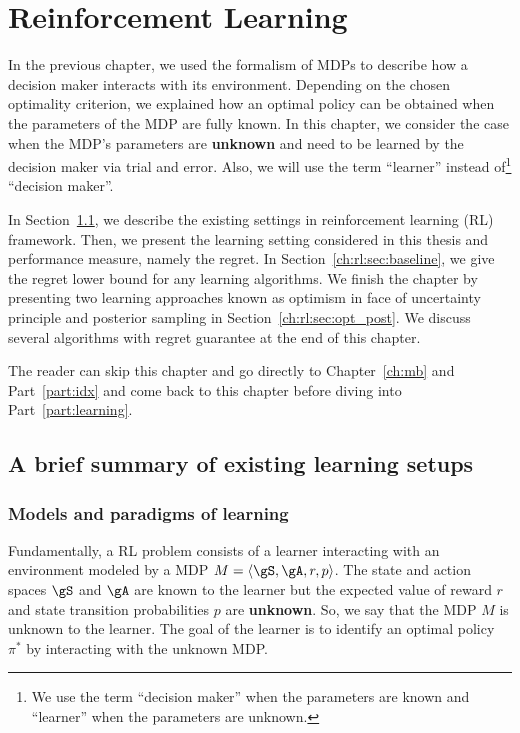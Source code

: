 \begingroup

\let\clearpage\relax

\chapter{Reinforcement Learning}
\label{ch:rl}


In the previous chapter, we used the formalism of MDPs to describe how a decision maker interacts with its environment.
Depending on the chosen optimality criterion, we explained how an optimal policy can be obtained when the parameters of the MDP are fully known.
In this chapter, we consider the case when the MDP's parameters are \textbf{unknown} and need to be learned by the decision maker via trial and error.
Also, we will use the term ``learner'' instead of\footnote{We use the term ``decision maker'' when the parameters are known and ``learner'' when the parameters are unknown.} ``decision maker''.

In Section~\ref{ch:rl:sec:overal}, we describe the existing settings in reinforcement learning (RL) framework.
Then, we present the learning setting considered in this thesis and performance measure, namely the regret. 
In Section~\ref{ch:rl:sec:baseline}, we give the regret lower bound for any learning algorithms.
We finish the chapter by presenting two learning approaches known as optimism in face of uncertainty principle and posterior sampling in Section~\ref{ch:rl:sec:opt_post}.
We discuss several algorithms with regret guarantee at the end of this chapter.

The reader can skip this chapter and go directly to Chapter~\ref{ch:mb} and Part~\ref{part:idx} and come back to this chapter before diving into Part~\ref{part:learning}.

\section{A brief summary of existing learning setups}
\label{ch:rl:sec:overal}

\subsection{Models and paradigms of learning}

Fundamentally, a RL problem consists of a learner interacting with an environment modeled by a MDP $M=\langle\gS,\gA,r,p\rangle$.
The state and action spaces $\gS$ and $\gA$ are known to the learner but the expected value of reward $r$ and state transition probabilities $p$ are \textbf{unknown}.
So, we say that the MDP $M$ is unknown to the learner.
The goal of the learner is to identify an optimal policy $\pi^*$ by interacting with the unknown MDP.


